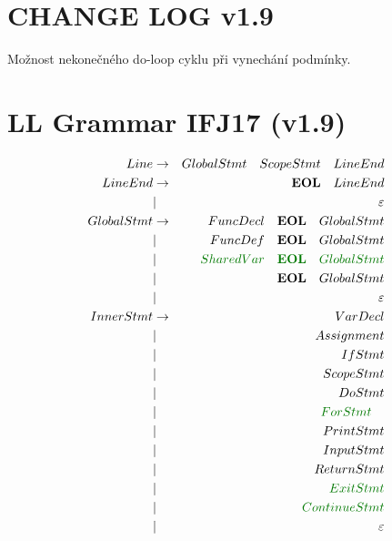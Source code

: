 \documentclass[a4paper,11pt,landscape,leqno]{article}
\begin{document}
\section{CHANGE LOG v1.9}
Možnost nekonečného do-loop cyklu při vynechání podmínky.
\section{LL Grammar IFJ17 (v1.9)}
\begin{eqnarray}
Line		&	\rightarrow		& GlobalStmt\quad ScopeStmt\quad  LineEnd	 \\
LineEnd		& \rightarrow		& \textbf{EOL}\quad LineEnd\\
			&		|			& \varepsilon		  \\
GlobalStmt	&	\rightarrow		&  FuncDecl\quad \textbf{EOL}\quad GlobalStmt	 \\
			&		|			& FuncDef\quad \textbf{EOL}\quad GlobalStmt    \\
			&		|			& \textcolor{green1}{SharedVar\quad \textbf{EOL}\quad GlobalStmt}	 \\
			&		|			& \textbf{EOL}\quad GlobalStmt\\
			&		|			& \varepsilon \\
InnerStmt	&	\rightarrow		& VarDecl  \\
			&		|			& Assignment	\\
			&		|			& IfStmt	\\
			&		|			& ScopeStmt   \\
			&		|			& DoStmt  \\
			&		|			& \textcolor{green1}{ForStmt}\quad	\\
			&		|			& PrintStmt \\
			&		|			& InputStmt  \\
			&		|			& ReturnStmt  \\
			&		|			& \textcolor{green1}{ExitStmt}	\\
			&		|			& \textcolor{green1}{ContinueStmt}	\\
			&		|			& \varepsilon \\

\end{eqnarray}
\end{document}
